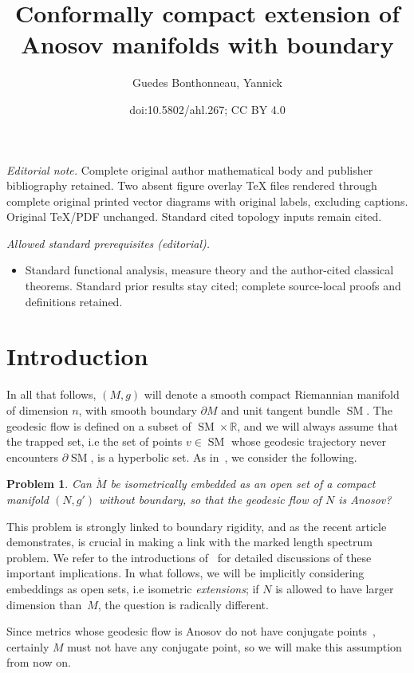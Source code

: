 \documentclass[10pt]{amsart}
\title{Conformally compact extension of Anosov manifolds with boundary}
\author{Guedes Bonthonneau, Yannick}
\date{doi:10.5802/ahl.267; CC BY 4.0}
\theoremstyle{definition}\newtheorem{defi}[theo]{Definition}\newtheorem{rema}[theo]{Remark}\newtheorem{exam}[theo]{Example}\newtheorem{exem}[theo]{Example}\newtheorem{nota}[theo]{Notation}
\newcommand{\R}{\mathbb{R}}
\DeclareMathOperator{\SM}{SM}
\theoremstyle{plain}
\newtheorem{probl}{Problem}
\begin{document}
\maketitle
\noindent\textit{Editorial note.} Complete original author mathematical body and publisher bibliography retained. Two absent figure overlay TeX files rendered through complete original printed vector diagrams with original labels, excluding captions. Original TeX/PDF unchanged. Standard cited topology inputs remain cited.\par\medskip
\noindent\textit{Allowed standard prerequisites (editorial).}\begin{itemize}
\item Standard functional analysis, measure theory and the author-cited classical theorems. Standard prior results stay cited; complete source-local proofs and definitions retained.
\end{itemize}\medskip


\section{Introduction}

In all that follows, $(M,g)$ will denote a smooth compact Riemannian manifold of dimension $n$, with smooth boundary $\partial M$ and unit tangent bundle $\SM$. The geodesic flow is defined on a subset of $\SM \times\R$, and we will always assume that the trapped set, i.e the set of points $v\in \SM$ whose geodesic trajectory never encounters $\partial \SM$, is a hyperbolic set. As in~\cite{Chen-Erchenko-Gogolev}, we consider the following.

\begin{probl}
\label{probA}
Can $\mathring{M}$ be isometrically embedded as an open set of a compact manifold $(N,g')$ without boundary, so that the geodesic flow of $N$ is Anosov?
\end{probl}

This problem is strongly linked to boundary rigidity, and as the recent article~\cite{Erchenko-Lefeuvre} demonstrates, is crucial in making a link with the marked length spectrum problem. We refer to the introductions of~\cite{Chen-Erchenko-Gogolev,Erchenko-Lefeuvre} for detailed discussions of these important implications. In what follows, we will be implicitly considering embeddings as open sets, i.e isometric \emph{extensions}; if $N$ is allowed to have larger dimension than~$M$, the question is radically different.


Since metrics whose geodesic flow is Anosov do not have conjugate points~\cite{Klingenberg-1974}, certainly $M$ must not have any conjugate point, so we will make this assumption from now on.
\end{document}
